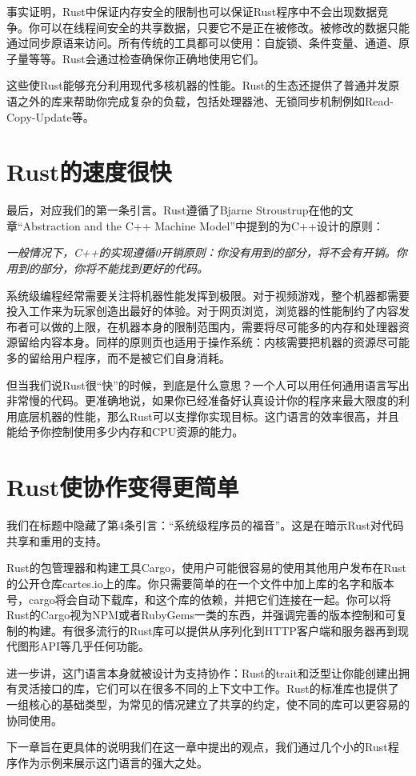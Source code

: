 事实证明，Rust中保证内存安全的限制也可以保证Rust程序中不会出现数据竞争。你可以在线程间安全的共享数据，只要它不是正在被修改。被修改的数据只能通过同步原语来访问。所有传统的工具都可以使用：自旋锁、条件变量、通道、原子量等等。Rust会通过检查确保你正确地使用它们。

这些使Rust能够充分利用现代多核机器的性能。Rust的生态还提供了普通并发原语之外的库来帮助你完成复杂的负载，包括处理器池、无锁同步机制例如Read-Copy-Update等。

\section{Rust的速度很快}
最后，对应我们的第一条引言。Rust遵循了Bjarne Stroustrup在他的文章“Abstraction and the C++ Machine Model”中提到的为C++设计的原则：

\emph{一般情况下，C++的实现遵循0开销原则：你没有用到的部分，将不会有开销。你用到的部分，你将不能找到更好的代码。}

系统级编程经常需要关注将机器性能发挥到极限。对于视频游戏，整个机器都需要投入工作来为玩家创造出最好的体验。对于网页浏览，浏览器的性能制约了内容发布者可以做的上限，在机器本身的限制范围内，需要将尽可能多的内存和处理器资源留给内容本身。同样的原则页也适用于操作系统：内核需要把机器的资源尽可能多的留给用户程序，而不是被它们自身消耗。

但当我们说Rust很“快”的时候，到底是什么意思？一个人可以用任何通用语言写出非常慢的代码。更准确地说，如果你已经准备好认真设计你的程序来最大限度的利用底层机器的性能，那么Rust可以支撑你实现目标。这门语言的效率很高，并且能给予你控制使用多少内存和CPU资源的能力。

\section{Rust使协作变得更简单}
我们在标题中隐藏了第4条引言：“系统级程序员的福音”。这是在暗示Rust对代码共享和重用的支持。

Rust的包管理器和构建工具Cargo，使用户可能很容易的使用其他用户发布在Rust的公开仓库cartes.io上的库。你只需要简单的在一个文件中加上库的名字和版本号，cargo将会自动下载库，和这个库的依赖，并把它们连接在一起。你可以将Rust的Cargo视为NPM或者RubyGems一类的东西，并强调完善的版本控制和可复制的构建。有很多流行的Rust库可以提供从序列化到HTTP客户端和服务器再到现代图形API等几乎任何功能。

进一步讲，这门语言本身就被设计为支持协作：Rust的trait和泛型让你能创建出拥有灵活接口的库，它们可以在很多不同的上下文中工作。Rust的标准库也提供了一组核心的基础类型，为常见的情况建立了共享的约定，使不同的库可以更容易的协同使用。

下一章旨在更具体的说明我们在这一章中提出的观点，我们通过几个小的Rust程序作为示例来展示这门语言的强大之处。